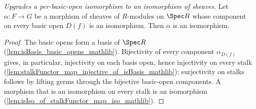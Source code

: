\begin{lemma}
  \label{lem:isIso_sheaf_of_isIso_app_basicOpen}
  \textit{Upgrades a per-basic-open isomorphism to an isomorphism of sheaves.}
  Let \(\alpha : F \to G\) be a morphism of sheaves of \(R\)-modules on \(\Spec R\) whose component
  on every basic open \(D(f)\) is an isomorphism. Then \(\alpha\) is an isomorphism.
\end{lemma}
\begin{proof}
  The basic opens form a basis of \(\Spec R\) (\cref{lem:isBasis_basic_opens_mathlib}). Bijectivity
  of every component \(\alpha_{D(f)}\) gives, in particular, injectivity on each basis open, hence
  injectivity on every stalk (\cref{lem:stalkFunctor_map_injective_of_isBasis_mathlib});
  surjectivity on stalks follows by lifting germs through the bijective basic-open components. A
  morphism that is an isomorphism on every stalk is an isomorphism
  (\cref{lem:isIso_of_stalkFunctor_map_iso_mathlib}).
\end{proof}

